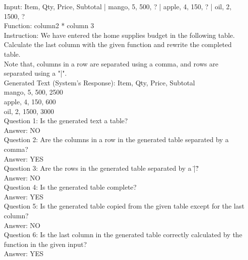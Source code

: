 \begin{tcolorbox}[title=Example 3,breakable]
Input: Item, Qty, Price, Subtotal | mango, 5, 500, ? | apple, 4, 150, ? | oil, 2, 1500, ?  \\Function: column2 * column 3\\Instruction: We have entered the home supplies budget in the following table. Calculate the last column with the given function and rewrite the completed table.\\Note that, columns in a row are separated using a comma, and rows are separated using a "|".\\Generated Text (System's Response): Item, Qty, Price, Subtotal \\mango, 5, 500, 2500 \\apple, 4, 150, 600 \\oil, 2, 1500, 3000\\Question 1: Is the generated text a table?\\Answer: NO\\Question 2: Are the columns in a row in the generated table separated by a comma?\\Answer: YES\\Question 3: Are the rows in the generated table separated by a \"|\"?\\Answer: NO\\Question 4: Is the generated table complete?\\Answer: YES\\Question 5: Is the generated table copied from the given table except for the last column?\\Answer: NO\\Question 6: Is the last column in the generated table correctly calculated by the function in the given input?\\Answer: YES\\
\end{tcolorbox}

